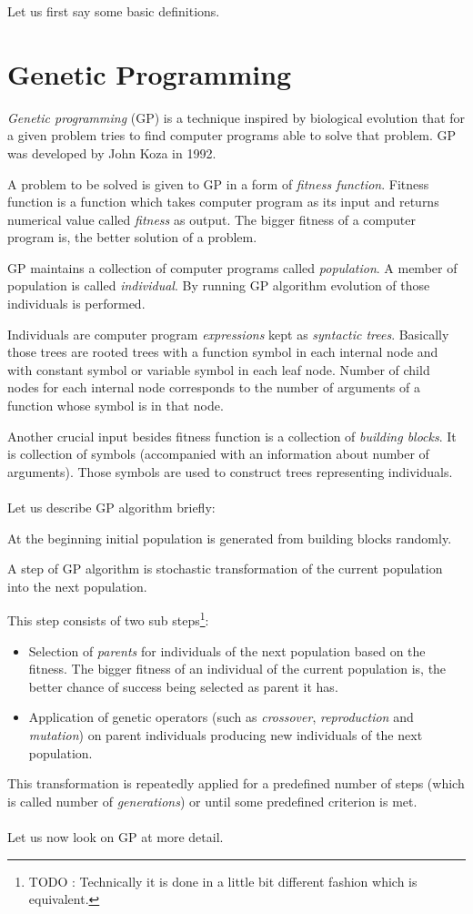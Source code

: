 \documentclass[12pt,a4paper]{report}
\newcommand{\Lets}{Let us\xspace}
\begin{document}
	\Lets first say some basic definitions.

\section{Genetic Programming}
\label{GP}

\textit{Genetic programming} (GP) is a technique inspired by biological evolution
that for a given problem tries to find computer programs able to solve that problem. 
GP was developed by John Koza \cite{koza92} in 1992.

A problem to be solved is given to GP in a form of \textit{fitness function}. 
Fitness function is a function which takes computer program as its input and 
returns numerical value called \textit{fitness} as output. 
The bigger fitness of a computer program is, the better solution of a problem.

GP maintains a collection of computer programs called \textit{population}. 
A member of population is called \textit{individual}. 
By running GP algorithm evolution of those individuals is performed.

Individuals are computer program \textit{expressions} kept as \textit{syntactic trees}. 
Basically those trees are rooted trees with a function symbol in each internal node 
and with constant symbol or variable symbol in each leaf node. 
Number of child nodes for each internal node corresponds to the number of arguments of a function whose symbol is in that node.

Another crucial input besides fitness function is a collection of \textit{building blocks}.
It is collection of symbols (accompanied with an information about number of arguments).
Those symbols are used to construct trees representing individuals.  
\\\\
\Lets describe GP algorithm briefly:

At the beginning initial population is generated from building blocks randomly.

A step of GP algorithm is stochastic transformation of the current population into 	
the next population.

This step consists of two sub steps\footnote{TODO : Technically it is done in a little  
bit different fashion which is equivalent.}:
\begin{itemize} 
	\item Selection of \textit{parents} for individuals of the next population based on the fitness.
	      The bigger fitness of an individual of the current population is, 
	      the better chance of success being selected as parent it has.  
	\item Application of genetic operators (such as \textit{crossover}, 
	      \textit{reproduction} and \textit{mutation}) 
		  on parent individuals producing new individuals of the next population.  
\end{itemize}	  
This transformation is repeatedly applied for a predefined number of steps (which is called 
number of \textit{generations}) or until some predefined criterion is met.	
\\\\
\Lets now look on GP at more detail. 
\end{document}
